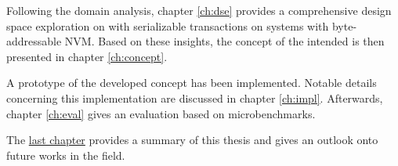 
Following the domain analysis, chapter \ref{ch:dse} provides a comprehensive
design space exploration on \kvsp with serializable transactions on systems with
byte-addressable \ac{NVM}. Based on these insights, the concept of the intended
\kvs is then presented in chapter \ref{ch:concept}.

A prototype of the developed concept has been implemented. Notable details
concerning this implementation are discussed in chapter \ref{ch:impl}.
Afterwards, chapter \ref{ch:eval} gives an evaluation based on microbenchmarks.

The \hyperref[ch:summary]{last chapter} provides a summary of this thesis and
gives an outlook onto future works in the field.
